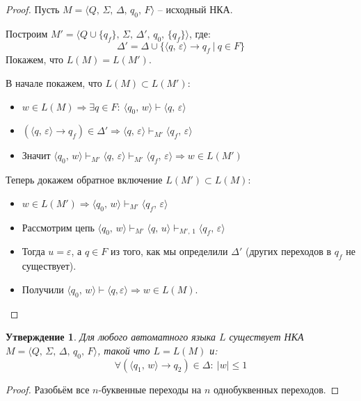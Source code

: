 \documentclass[a4paper,12pt]{article}
\renewcommand{\leq}{\ensuremath{\leqslant}}
\theoremstyle{plain}
\newtheorem{proposition}{Утверждение}[subsection]
\theoremstyle{definition}
\theoremstyle{remark}
\begin{document}
\begin{proof}
	Пусть $M = \langle Q,\,\Sigma,\, \Delta,\, q_0,\, F \rangle$ -- исходный НКА.

	Построим $M' = \langle Q \cup \{q_f\},\,\Sigma,\, \Delta',\, q_0,\, \{q_f\} \rangle$, где:
	\[
		\Delta' = \Delta \cup \{\langle q,\, \varepsilon\rangle \to q_f \:|\: q \in F\}
	\]
	Покажем, что $L(M) = L(M')$.

	В начале покажем, что $L(M) \subset L(M')$:
	\begin{itemize}
		\item $w \in L(M) \Rightarrow \exists q \in F:\: \langle q_0,\, w\rangle \vdash \langle q,\, \varepsilon\rangle$
		\item $(\langle q,\, \varepsilon\rangle \to q_f) \in \Delta' \Rightarrow \langle q,\, \varepsilon\rangle \vdash_{M'} \langle q_f,\, \varepsilon\rangle$
		\item Значит $\langle q_0,\, w\rangle \vdash_{M'} \langle q,\, \varepsilon\rangle \vdash_{M'} \langle q_f,\, \varepsilon\rangle \Rightarrow w \in L(M')$
	\end{itemize}
	Теперь докажем обратное включение $L(M') \subset L(M)$:
	\begin{itemize}
		\item $w \in L(M') \Rightarrow \langle q_0,\, w\rangle \vdash_{M'} \langle q_f,\, \varepsilon\rangle$
		\item Рассмотрим цепь $\langle q_0,\, w\rangle \vdash_{M'} \langle q,\, u\rangle \vdash_{M',\, 1} \langle q_f,\, \varepsilon\rangle$
		\item Тогда $u = \varepsilon$, а $q \in F$ из того, как мы определили $\Delta'$ (других переходов в $q_f$ не существует).
		\item Получили $\langle q_0,\, w\rangle \vdash \langle q, \varepsilon \rangle \Rightarrow w \in L(M)$.
	\end{itemize}
\end{proof}

\begin{proposition}
	Для любого автоматного языка $L$ существует НКА $M = \langle Q,\,\Sigma,\, \Delta,\, q_0,\, F \rangle$, такой что $L = L(M)$ и:
	\[
		\forall (\langle q_1,\, w\rangle \to q_2) \in \Delta :\: |w| \leq 1
	\]
\end{proposition}

\begin{proof}
	Разобьём все $n$-буквенные переходы на $n$ однобуквенных переходов.
\end{proof}
\end{document}
